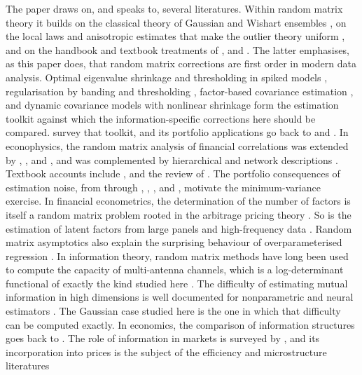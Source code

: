 The paper draws on, and speaks to, several literatures. Within random matrix theory it builds on the classical theory of Gaussian and Wishart ensembles \citep{mehta2004random,forrester2010log,dumitriu2002matrix,edelman2005random}, on the local laws and anisotropic estimates that make the outlier theory uniform \citep{knowles2017anisotropic}, and on the handbook and textbook treatments of \citet{akemann2011oxford}, \citet{livan2018introduction} and \citet{couillet2022random}. The latter emphasises, as this paper does, that random matrix corrections are first order in modern data analysis. Optimal eigenvalue shrinkage and thresholding in spiked models \citep{gavish2014optimal,donoho2018optimal}, regularisation by banding and thresholding \citep{bickel2008regularized}, factor-based covariance estimation \citep{fan2013large}, and dynamic covariance models with nonlinear shrinkage \citep{engle2002dynamic,engle2019large} form the estimation toolkit against which the information-specific corrections here should be compared. \citet{ledoit2022power} survey that toolkit, and its portfolio applications go back to \citet{ledoit2003improved} and \citet{ledoit2017nonlinear}. In econophysics, the random matrix analysis of financial correlations was extended by \citet{gopikrishnan2001quantifying}, \citet{plerou2002random}, \citet{utsugi2004random} and \citet{burda2005spectral}, and was complemented by hierarchical and network descriptions \citep{mantegna1999hierarchical,tumminello2010correlation}. Textbook accounts include \citet{mantegna2000introduction}, \citet{bouchaud2003theory} and the review of \citet{kwapien2012physical}. The portfolio consequences of estimation noise, from \citet{markowitz1952portfolio} through \citet{elton1973estimating}, \citet{michaud1989markowitz}, \citet{jagannathan2003risk}, \citet{pafka2002noisy} and \citet{kondor2007noise}, motivate the minimum-variance exercise. In financial econometrics, the determination of the number of factors \citep{bai2002determining,onatski2009testing,onatski2010determining,ahn2013eigenvalue} is itself a random matrix problem rooted in the arbitrage pricing theory \citep{ross1976arbitrage,chamberlain1983arbitrage}. So is the estimation of latent factors from large panels and high-frequency data \citep{lettau2020factors,lettau2020estimating,pelger2020understanding,aitsahalia2017using}. Random matrix asymptotics also explain the surprising behaviour of overparameterised regression \citep{hastie2022surprises}. In information theory, random matrix methods have long been used to compute the capacity of multi-antenna channels, which is a log-determinant functional of exactly the kind studied here \citep{telatar1999capacity,tulino2004random}. The difficulty of estimating mutual information in high dimensions is well documented for nonparametric and neural estimators \citep{paninski2003estimation,kraskov2004estimating,belghazi2018mutual,mcallester2020formal}. The Gaussian case studied here is the one in which that difficulty can be computed exactly. In economics, the comparison of information structures goes back to \citet{blackwell1953equivalent}. The role of information in markets is surveyed by \citet{stiglitz2000contributions}, and its incorporation into prices is the subject of the efficiency and microstructure literatures 